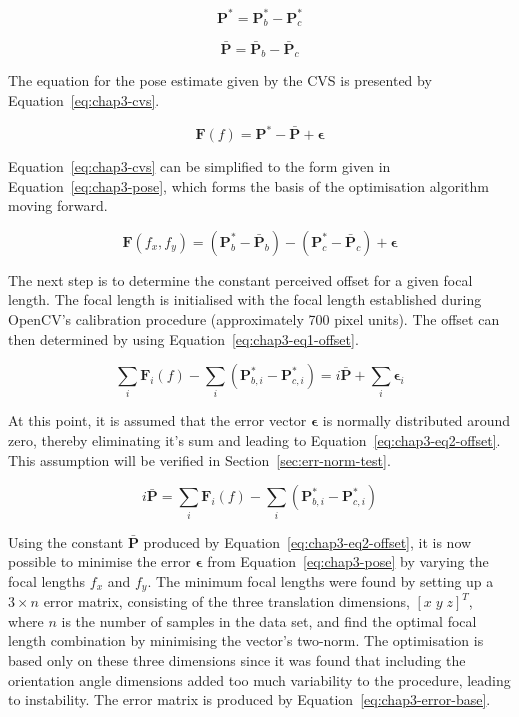 \begin{equation}
 \label{eq:chap3-calibration-pose}
  \bm{P}^* = \bm{P}^*_b - \bm{P}^*_c
\end{equation}

\begin{equation}
  \label{eq:chap3-offset}
  \bar{\bm{P}} = \bar{\bm{P}}_b - \bar{\bm{P}}_c
\end{equation}

The equation for the pose estimate given by the CVS is presented by Equation~\ref{eq:chap3-cvs}.

\begin{equation}
  \label{eq:chap3-cvs}
  \bm{F}(f) = \bm{P}^* - \bar{\bm{P}} + \bm{\epsilon}
\end{equation}

Equation~\ref{eq:chap3-cvs} can be simplified to the form given in Equation~\ref{eq:chap3-pose}, which forms the basis of the optimisation algorithm moving forward.  

\begin{equation}
  \label{eq:chap3-pose}
  \bm{F}(f_x, f_y) = (\bm{P}^*_b - \bar{\bm{P}}_b) - (\bm{P}^*_c - \bar{\bm{P}}_c) + \bm{\epsilon}
\end{equation}

The next step is to determine the constant perceived offset for a given focal length. The focal length is initialised with the focal length established during OpenCV's calibration procedure (approximately 700 pixel units). The offset can then determined by using Equation~\ref{eq:chap3-eq1-offset}.

\begin{equation}
  \label{eq:chap3-eq1-offset}
  \sum\limits_i \bm{F}_i(f) - \sum\limits_i(\bm{P}^*_{b,i} - \bm{P}^*_{c, i}) = i\bar{\bm{P}} + \sum\limits_i\bm{\epsilon}_i
\end{equation}

At this point, it is assumed that the error vector $\bm{\epsilon}$ is normally distributed around zero, thereby eliminating it's sum and leading to Equation~\ref{eq:chap3-eq2-offset}. This assumption will be verified in Section~\ref{sec:err-norm-test}. 

\begin{equation}
  \label{eq:chap3-eq2-offset}
  i\bar{\bm{P}} = \sum\limits_i \bm{F}_i(f) - \sum\limits_i(\bm{P}^*_{b,i} - \bm{P}^*_{c, i})
\end{equation}

Using the constant $\bar{\bm{P}}$ produced by Equation~\ref{eq:chap3-eq2-offset}, it is now possible to minimise the error $\bm{\epsilon}$ from Equation~\ref{eq:chap3-pose} by varying the focal lengths $f_x$ and $f_y$. The minimum focal lengths were found by setting up a $3\times n$ error matrix, consisting of the three translation dimensions, ${[x\;y\;z]}^T$, where $n$ is the number of samples in the data set, and find the optimal focal length combination by minimising the vector's  two-norm. The optimisation is based only on these three dimensions since it was found that including the orientation angle dimensions added too much variability to the procedure, leading to instability. The error matrix is produced by Equation~\ref{eq:chap3-error-base}.

